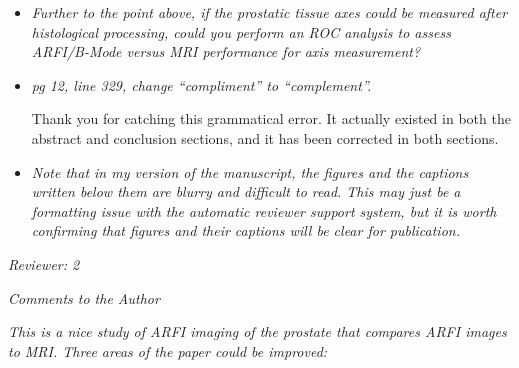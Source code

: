 \documentclass[10pt]{article}
\begin{document}
\begin{itemize}
    \item \textit{Further to the point above, if the prostatic tissue axes
            could be measured after histological processing, could you perform
            an ROC analysis to assess ARFI/B-Mode versus MRI performance for
            axis measurement?}

    \item \textit{pg 12, line 329, change ``compliment'' to ``complement''.}

    Thank you for catching this grammatical error.  It actually existed in both
    the abstract and conclusion sections, and it has been corrected in both
    sections.

    \item \textit{Note that in my version of the manuscript, the figures and
            the captions written below them are blurry and difficult to read.
            This may just be a formatting issue with the automatic reviewer
            support system, but it is worth confirming that figures and their
            captions will be clear for publication.}

\end{itemize}

\textit{Reviewer: 2}

\textit{Comments to the Author}

\textit{This is a nice study of ARFI imaging of the prostate that compares ARFI images
to MRI. Three areas of the paper could be improved:}
\end{document}
